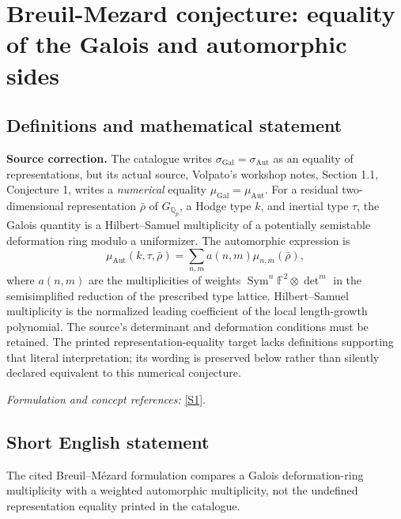 \documentclass[11pt,a4paper]{article}
\newcommand{\Q}{\mathbb{Q}}
\newcommand{\F}{\mathbb{F}}
\newcommand{\sref}[2]{\hyperlink{source:#1:#2}{[S#2]}}
\newif\ifshowcatalogue
\newcommand{\cataloguescope}[1]{\ifshowcatalogue
 \paragraph{Exact scope in the supplied catalogue.}
 \begin{quote}\small #1\end{quote}\fi}
\numberwithin{equation}{section}
\begin{document}
\setcounter{section}{0}
\clearpage
\section*{\texorpdfstring{Breuil-Mezard conjecture: equality of the Galois and automorphic sides}{Breuil-Mezard conjecture: equality of the Galois and automorphic sides}}\label{30006981}
\subsection{Definitions and mathematical statement}
\textbf{Source correction.} The catalogue writes $\sigma_{\mathrm{Gal}}=\sigma_{\mathrm{Aut}}$ as an equality of representations, but its actual source, Volpato's workshop notes, Section 1.1, Conjecture 1, writes a \emph{numerical} equality $\mu_{\mathrm{Gal}}=\mu_{\mathrm{Aut}}$. For a residual two-dimensional representation $\bar\rho$ of $G_{\Q_p}$, a Hodge type $k$, and inertial type $\tau$, the Galois quantity is a Hilbert--Samuel multiplicity of a potentially semistable deformation ring modulo a uniformizer. The automorphic expression is
\[
 \mu_{\mathrm{Aut}}(k,\tau,\bar\rho)=\sum_{n,m}a(n,m)\mu_{n,m}(\bar\rho),
\]
where $a(n,m)$ are the multiplicities of weights
$\operatorname{Sym}^n\F^2\otimes\det^m$ in the semisimplified reduction of the prescribed type lattice. Hilbert--Samuel multiplicity is the normalized leading coefficient of the local length-growth polynomial. The source's determinant and deformation conditions must be retained. The printed representation-equality target lacks definitions supporting that literal interpretation; its wording is preserved below rather than silently declared equivalent to this numerical conjecture.
\par\smallskip\textit{Formulation and concept references:} \sref{30006981}{1}.
\cataloguescope{Conjecture (Breuil-Mezard): the equality sigma\_Gal = sigma\_Aut holds, where sigma\_Gal and sigma\_Aut are the Galois and automorphic (locally algebraic) representations attached to a mod p Galois representation.}
\subsection{Short English statement}
The cited Breuil–Mézard formulation compares a Galois deformation-ring multiplicity with a weighted automorphic multiplicity, not the undefined representation equality printed in the catalogue.
\end{document}
